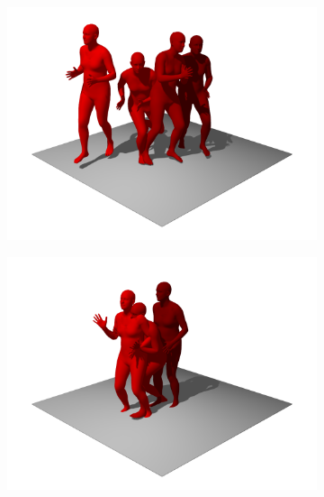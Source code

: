 \begin{figure}
    \centering
    \begin{subfigure}{0.32\linewidth}
        \includegraphics[width=\linewidth]{figures/results/single-kick1.png}
    \end{subfigure}
    \hfill
    \begin{subfigure}{0.32\linewidth}
        \includegraphics[width=\linewidth]{figures/results/single-kick2.png}
    \end{subfigure}
    \hfill
    \begin{subfigure}{0.32\linewidth}

\end{subfigure}
\end{figure}
